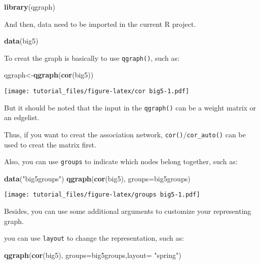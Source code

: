 \documentclass[]{article}
\newenvironment{Shaded}{\begin{snugshade}}{\end{snugshade}}
\newcommand{\KeywordTok}[1]{\textcolor[rgb]{0.13,0.29,0.53}{\textbf{#1}}}
\newcommand{\DataTypeTok}[1]{\textcolor[rgb]{0.13,0.29,0.53}{#1}}
\newcommand{\StringTok}[1]{\textcolor[rgb]{0.31,0.60,0.02}{#1}}
\newcommand{\NormalTok}[1]{#1}
\begin{document}
\begin{Shaded}
\begin{Highlighting}[]
\KeywordTok{library}\NormalTok{(qgraph)}
\end{Highlighting}
\end{Shaded}

And then, data need to be imported in the current R project.

\begin{Shaded}
\begin{Highlighting}[]
\KeywordTok{data}\NormalTok{(big5)}
\end{Highlighting}
\end{Shaded}

To creat the graph is basically to use \texttt{qgraph()}, such as:

\begin{Shaded}
\begin{Highlighting}[]
\NormalTok{qgraph<-}\KeywordTok{qgraph}\NormalTok{(}\KeywordTok{cor}\NormalTok{(big5))}
\end{Highlighting}
\end{Shaded}

\texttt{[image: tutorial\_files/figure-latex/cor big5-1.pdf]}

But it should be noted that the input in the \texttt{qgraph()} can be a
weight matrix or an edgelist.

Thus, if you want to creat the association network,
\texttt{cor()}/\texttt{cor\_auto()} can be used to creat the matrix
first.

Also, you can use \texttt{groups} to indicate which nodes belong
together, such as:

\begin{Shaded}
\begin{Highlighting}[]
\KeywordTok{data}\NormalTok{(}\StringTok{"big5groups"}\NormalTok{)}
\KeywordTok{qgraph}\NormalTok{(}\KeywordTok{cor}\NormalTok{(big5), }\DataTypeTok{groups=}\NormalTok{big5groups)}
\end{Highlighting}
\end{Shaded}

\texttt{[image: tutorial\_files/figure-latex/groups big5-1.pdf]}

Besides, you can use some additional arguments to customize your
representing graph.

you can use \texttt{layout} to change the representation, such as:

\begin{Shaded}
\begin{Highlighting}[]
\KeywordTok{qgraph}\NormalTok{(}\KeywordTok{cor}\NormalTok{(big5), }\DataTypeTok{groups=}\NormalTok{big5groups,}\DataTypeTok{layout=} \StringTok{"spring"}\NormalTok{)}
\end{Highlighting}
\end{Shaded}
\end{document}
